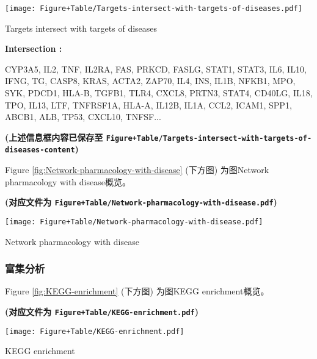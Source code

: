 \documentclass[
]{article}
\begin{document}
\def\@captype{figure}
\begin{center}
\texttt{[image: Figure+Table/Targets-intersect-with-targets-of-diseases.pdf]}
\caption{Targets intersect with targets of diseases}\label{fig:Targets-intersect-with-targets-of-diseases}
\end{center}
\begin{center}\begin{tcolorbox}[colback=gray!10, colframe=gray!50, width=0.9\linewidth, arc=1mm, boxrule=0.5pt]
\textbf{
Intersection
:}

\vspace{0.5em}

    CYP3A5, IL2, TNF, IL2RA, FAS, PRKCD, FASLG, STAT1,
STAT3, IL6, IL10, IFNG, TG, CASP8, KRAS, ACTA2, ZAP70, IL4,
INS, IL1B, NFKB1, MPO, SYK, PDCD1, HLA-B, TGFB1, TLR4,
CXCL8, PRTN3, STAT4, CD40LG, IL18, TPO, IL13, LTF,
TNFRSF1A, HLA-A, IL12B, IL1A, CCL2, ICAM1, SPP1, ABCB1,
ALB, TP53, CXCL10, TNFSF...

\vspace{2em}
\end{tcolorbox}
\end{center}

\textbf{(上述信息框内容已保存至 \texttt{Figure+Table/Targets-intersect-with-targets-of-diseases-content})}

Figure \ref{fig:Network-pharmacology-with-disease} (下方图) 为图Network pharmacology with disease概览。

\textbf{(对应文件为 \texttt{Figure+Table/Network-pharmacology-with-disease.pdf})}

\def\@captype{figure}
\begin{center}
\texttt{[image: Figure+Table/Network-pharmacology-with-disease.pdf]}
\caption{Network pharmacology with disease}\label{fig:Network-pharmacology-with-disease}
\end{center}

\hypertarget{ux5bccux96c6ux5206ux6790}{%
\subsubsection{富集分析}\label{ux5bccux96c6ux5206ux6790}}

Figure \ref{fig:KEGG-enrichment} (下方图) 为图KEGG enrichment概览。

\textbf{(对应文件为 \texttt{Figure+Table/KEGG-enrichment.pdf})}

\def\@captype{figure}
\begin{center}
\texttt{[image: Figure+Table/KEGG-enrichment.pdf]}
\caption{KEGG enrichment}\label{fig:KEGG-enrichment}
\end{center}
\end{document}
